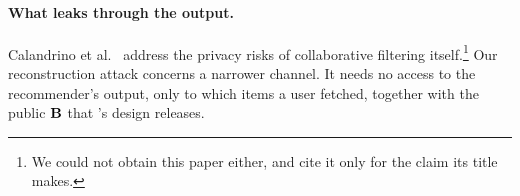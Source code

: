 \paragraph{What leaks through the output.} Calandrino et
al.~\cite{calandrino2011} address the privacy risks of collaborative filtering
itself.\footnote{We could not obtain this paper either, and cite it only for the
claim its title makes.} Our reconstruction attack concerns a narrower channel. It
needs no access to the recommender's output, only to which items a user fetched,
together with the public $\mathbf{B}$ that \nudgeplain{}'s design releases.
